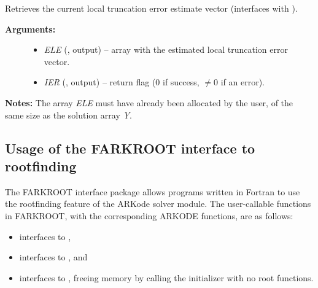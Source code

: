 \documentclass[letterpaper,10pt,english]{sphinxmanual}
\begin{document}
\begin{fulllineitems}
\label{f_interface/Optional_output:f/_/FARKGETESTLOCALERR}
Retrieves the current local truncation error estimate
vector (interfaces with {\hyperref[c_interface/User_callable:c.ARKodeGetEstLocalErrors]{\emph{}}}).
\begin{description}
\item[{\textbf{Arguments:}}] \leavevmode\begin{itemize}
\item {} 
\emph{ELE} (, output) -- array with the estimated local
truncation error vector.

\item {} 
\emph{IER}  (, output) -- return flag  (0 if success,
\(\ne 0\) if an error).

\end{itemize}

\end{description}

\textbf{Notes:}
The array \emph{ELE} must have already been allocated by the user, of
the same size as the solution array \emph{Y}.

\end{fulllineitems}



\subsection{Usage of the FARKROOT interface to rootfinding}
\label{f_interface/Rootfinding:usage-of-the-farkroot-interface-to-rootfinding}\label{f_interface/Rootfinding::doc}\label{f_interface/Rootfinding:finterface-rootfinding}
The FARKROOT interface package allows programs written in Fortran to
use the rootfinding feature of the ARKode solver module. The
user-callable functions in FARKROOT, with the corresponding ARKODE
functions, are as follows:
\begin{itemize}
\item {} 
{\hyperref[f_interface/Rootfinding:f/_/FARKROOTINIT]{\emph{}}} interfaces to {\hyperref[c_interface/User_callable:c.ARKodeRootInit]{\emph{}}},

\item {} 
{\hyperref[f_interface/Rootfinding:f/_/FARKROOTINFO]{\emph{}}} interfaces to
{\hyperref[c_interface/User_callable:c.ARKodeGetRootInfo]{\emph{}}}, and

\item {} 
{\hyperref[f_interface/Rootfinding:f/_/FARKROOTFREE]{\emph{}}} interfaces to {\hyperref[c_interface/User_callable:c.ARKodeRootInit]{\emph{}}},
freeing memory by calling the initializer with no root functions.

\end{itemize}
\end{document}
